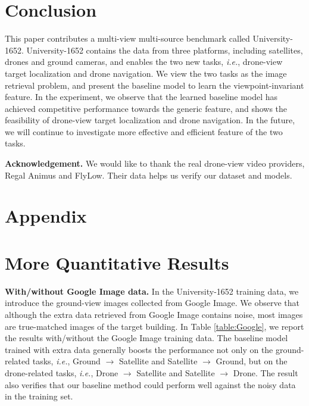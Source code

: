 \documentclass[sigconf]{acmart}
\def\ie{\emph{i.e.}}
\begin{document}
\section{Conclusion}
This paper contributes a multi-view multi-source benchmark called University-1652. University-1652 contains the data from three platforms, including satellites, drones and ground cameras, and enables the two new tasks, \ie, drone-view target localization and drone navigation. We view the two tasks as the image retrieval problem, and present the baseline model to learn the viewpoint-invariant feature. In the experiment, we observe that the learned baseline model has achieved competitive performance towards the generic feature, and shows the feasibility of drone-view target localization and drone navigation. In the future, we will continue to investigate more effective and efficient feature of the two tasks. 

\noindent\textbf{Acknowledgement.} We would like to thank the real drone-view video providers, Regal Animus and FlyLow. Their data helps us verify our dataset and models. 

{


}

\clearpage
\appendix
\section*{Appendix}
\setcounter{section}{0}
\renewcommand\thesection{\Alph{section}}

\section{More Quantitative Results}



\textbf{With/without Google Image data.} In the University-1652 training data, we introduce the ground-view images collected from Google Image. We observe that although the extra data retrieved from Google Image contains noise, most images are true-matched images of the target building. In Table \ref{table:Google}, we report the results with/without the Google Image training data. The baseline model trained with extra data generally boosts the performance not only on the ground-related tasks, \ie, Ground $\rightarrow$ Satellite and Satellite $\rightarrow$ Ground,  but on the drone-related tasks, \ie, Drone $\rightarrow$ Satellite and Satellite $\rightarrow$ Drone. The result also verifies that our baseline method could perform well against the noisy data in the training set.
\end{document}
